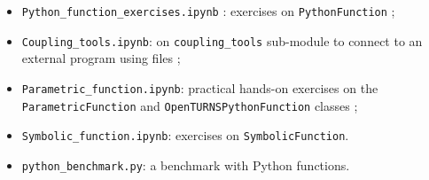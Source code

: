 \documentclass[11pt]{article}
\providecommand{\tightlist}{%
      \setlength{\itemsep}{0pt}\setlength{\parskip}{0pt}}
\begin{document}
\begin{itemize}
\tightlist
\item
  \texttt{Python\_function\_exercises.ipynb} : exercises on
  \texttt{PythonFunction} ;
\item
  \texttt{Coupling\_tools.ipynb}: on \texttt{coupling\_tools} sub-module
  to connect to an external program using files ;
\item
  \texttt{Parametric\_function.ipynb}: practical hands-on exercises on the 
  \texttt{ParametricFunction} and \texttt{OpenTURNSPythonFunction} classes ;
\item
  \texttt{Symbolic\_function.ipynb}: exercises on
  \texttt{SymbolicFunction}.
\item
  \texttt{python\_benchmark.py}: a benchmark with Python functions.
\end{itemize}



    
    
    
\end{document}
